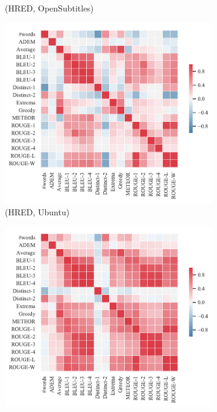 \begin{figure}[htbp]
\begin{subfigure}{0.35\linewidth}
        \caption{(HRED, OpenSubtitles)}
    \end{subfigure}%
    \begin{subfigure}{0.35\linewidth}
        \centering
        \includegraphics[width=\linewidth]{figure/plot/heatmap/v4/pearson/hred/ubuntu/plot.pdf}
        \caption{(HRED, Ubuntu)}
    \end{subfigure}
    \begin{subfigure}{0.35\linewidth}
        \centering
        \includegraphics[width=\linewidth]{figure/plot/heatmap/v4/pearson/vhred/lsdscc/plot.pdf}

\end{subfigure}
\end{figure}
